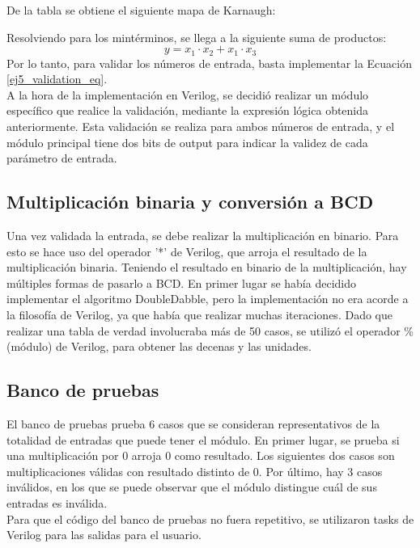 
\noindent
De la tabla se obtiene el siguiente mapa de Karnaugh:



\noindent
Resolviendo para los mint\'erminos, se llega a la siguiente suma de productos: 
\begin{equation}
    y = x_1\cdot x_2 + x_1\cdot x_3
    \label{ej5_validation_eq}
\end{equation}
\noindent
Por lo tanto, para validar los n\'umeros de entrada, basta implementar la Ecuaci\'on \ref{ej5_validation_eq}. \\
A la hora de la implementaci\'on en Verilog, se decidi\'o realizar un m\'odulo espec\'ifico que realice la validaci\'on, mediante la expresi\'on l\'ogica obtenida anteriormente. Esta validaci\'on se realiza para ambos n\'umeros de entrada, y el m\'odulo principal tiene dos bits de output para indicar la validez de cada par\'ametro de entrada.
\subsection{Multiplicaci\'on binaria y conversi\'on a BCD}
\noindent
Una vez validada la entrada, se debe realizar la multiplicaci\'on en binario. Para esto se hace uso del operador '*' de Verilog, que arroja el resultado de la multiplicaci\'on binaria. Teniendo el resultado en binario de la multiplicaci\'on, hay m\'ultiples formas de pasarlo a BCD. En primer lugar se hab\'ia decidido implementar el algoritmo DoubleDabble, pero la implementaci\'on no era acorde a la filosof\'ia de Verilog, ya que hab\'ia que realizar muchas iteraciones. Dado que realizar una tabla de verdad involucraba m\'as de 50 casos, se utiliz\'o el operador \% (m\'odulo) de Verilog, para obtener las decenas y las unidades.
\subsection{Banco de pruebas}
\noindent
El banco de pruebas prueba 6 casos que se consideran representativos de la totalidad de entradas que puede tener el m\'odulo. En primer lugar, se prueba si una multiplicaci\'on por 0 arroja 0 como resultado. Los siguientes dos casos son multiplicaciones v\'alidas con resultado distinto de 0. Por \'ultimo, hay 3 casos inv\'alidos, en los que se puede observar que el m\'odulo distingue cu\'al de sus entradas es inv\'alida. \\
Para que el c\'odigo del banco de pruebas no fuera repetitivo, se utilizaron tasks de Verilog para las salidas para el usuario.